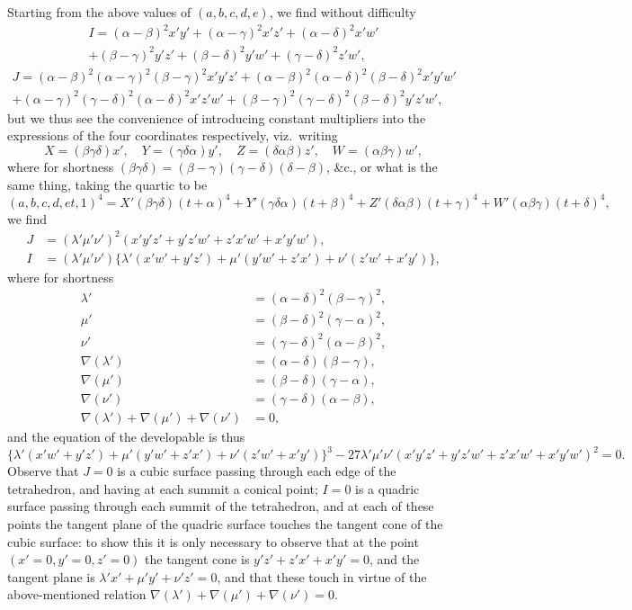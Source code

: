 \documentclass[11pt,a4paper]{article}
\theoremstyle{definition}
\begin{document}
Starting from the above values of $(a,b,c,d,e)$, we find without difficulty
\begin{multline*}
I = (\alpha-\beta)^2 x'y' + (\alpha-\gamma)^2 x'z' + (\alpha-\delta)^2 x'w' \\
+ (\beta-\gamma)^2 y'z' + (\beta-\delta)^2 y'w' + (\gamma-\delta)^2 z'w',
\end{multline*}
\begin{multline*}
J = (\alpha-\beta)^2(\alpha-\gamma)^2(\beta-\gamma)^2 x'y'z' + (\alpha-\beta)^2(\alpha-\delta)^2(\beta-\delta)^2 x'y'w' \\
+ (\alpha-\gamma)^2(\gamma-\delta)^2(\alpha-\delta)^2 x'z'w' + (\beta-\gamma)^2(\gamma-\delta)^2(\beta-\delta)^2 y'z'w',
\end{multline*}
but we thus see the convenience of introducing constant multipliers into the expressions of the four coordinates respectively, viz.\ writing
\[
X = (\beta\gamma\delta) x',\quad Y = (\gamma\delta\alpha) y',\quad Z = (\delta\alpha\beta) z',\quad W = (\alpha\beta\gamma) w',
\]
where for shortness $(\beta\gamma\delta) = (\beta-\gamma)(\gamma-\delta)(\delta-\beta)$, \&c., or what is the same thing, taking the quartic to be
\[
(a,b,c,d,e t, 1)^4 = X'(\beta\gamma\delta)(t+\alpha)^4 + Y'(\gamma\delta\alpha)(t+\beta)^4 + Z'(\delta\alpha\beta)(t+\gamma)^4 + W'(\alpha\beta\gamma)(t+\delta)^4,
\]
we find
\begin{align*}
J &= (\lambda'\mu'\nu')^2 (x'y'z' + y'z'w' + z'x'w' + x'y'w'),\\
I &= (\lambda'\mu'\nu') \{\lambda'(x'w'+y'z') + \mu'(y'w'+z'x') + \nu'(z'w'+x'y')\},
\end{align*}
where for shortness
\begin{align*}
\lambda' &= (\alpha-\delta)^2(\beta-\gamma)^2,\\
\mu' &= (\beta-\delta)^2(\gamma-\alpha)^2,\\
\nu' &= (\gamma-\delta)^2(\alpha-\beta)^2,\\
\nabla(\lambda') &= (\alpha-\delta)(\beta-\gamma),\\
\nabla(\mu') &= (\beta-\delta)(\gamma-\alpha),\\
\nabla(\nu') &= (\gamma-\delta)(\alpha-\beta),\\
\nabla(\lambda') + \nabla(\mu') + \nabla(\nu') &= 0,
\end{align*}
and the equation of the developable is thus
\[
\{\lambda'(x'w'+y'z') + \mu'(y'w'+z'x') + \nu'(z'w'+x'y')\}^3 - 27\lambda'\mu'\nu'(x'y'z' + y'z'w' + z'x'w' + x'y'w')^2 = 0.
\]
Observe that $J = 0$ is a cubic surface passing through each edge of the tetrahedron, and having at each summit a conical point; $I = 0$ is a quadric surface passing through each summit of the tetrahedron, and at each of these points the tangent plane of the quadric surface touches the tangent cone of the cubic surface: to show this it is only necessary to observe that at the point $(x' = 0, y' = 0, z' = 0)$ the tangent cone is $y'z' + z'x' + x'y' = 0$, and the tangent plane is $\lambda'x' + \mu'y' + \nu'z' = 0$, and that these touch in virtue of the above-mentioned relation $\nabla(\lambda') + \nabla(\mu') + \nabla(\nu') = 0$.
\end{document}
